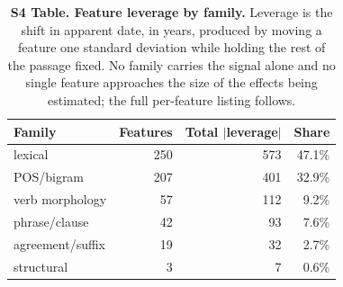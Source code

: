 \begin{table}[!ht]
\centering
\footnotesize
\caption{{\bf S4 Table. Feature leverage by family.}  Leverage is the shift in apparent date, in years, produced by moving a feature one standard deviation while holding the rest of the passage fixed.  No family carries the signal alone and no single feature approaches the size of the effects being estimated; the full per-feature listing follows.}
\label{tab:s4}
\begin{tabular}{lrrr}
\toprule
\textbf{Family} & \textbf{Features} & \textbf{Total $|$leverage$|$} & \textbf{Share} \\
\midrule
lexical & 250 & 573 & 47.1\% \\
POS/bigram & 207 & 401 & 32.9\% \\
verb morphology & 57 & 112 & 9.2\% \\
phrase/clause & 42 & 93 & 7.6\% \\
agreement/suffix & 19 & 32 & 2.7\% \\
structural & 3 & 7 & 0.6\% \\
\bottomrule
\end{tabular}
\end{table}

